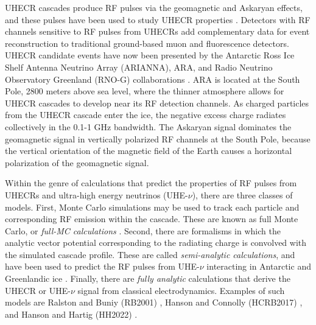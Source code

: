 \documentclass[amsmath,amssymb,aps,prd,10pt,twocolumn,showkeys]{revtex4}
\begin{document}
UHECR cascades produce RF pulses via the geomagnetic and Askaryan effects, and these pulses have been used to study UHECR properties \cite{huege2017radiowave-6f6,schroder2025radio-14a}.  Detectors with RF channels sensitive to RF pulses from UHECRs add complementary data for event reconstruction to traditional ground-based muon and fluorescence detectors.  UHECR candidate events have now been presented by the Antarctic Ross Ice Shelf Antenna Neutrino Array (ARIANNA), ARA, and Radio Neutrino Observatory Greenland (RNO-G) collaborations \cite{barwick2017radio-c4a,xwqy-yzrk,agarwal2025validating-d6c}.  ARA is located at the South Pole, 2800 meters above sea level, where the thinner atmosphere allows for UHECR cascades to develop near its RF detection channels.  As charged particles from the UHECR cascade enter the ice, the negative excess charge radiates collectively in the 0.1-1 GHz bandwidth.  The Askaryan signal dominates the geomagnetic signal in vertically polarized RF channels at the South Pole, because the vertical orientation of the magnetic field of the Earth causes a horizontal polarization of the geomagnetic signal.

Within the genre of calculations that predict the properties of RF pulses from UHECRs and ultra-high energy neutrinos (UHE-$\nu$), there are three classes of models.  First, Monte Carlo simulations may be used to track each particle and corresponding RF emission within the cascade.  These are known as full Monte Carlo, or \textit{full-MC calculations} \cite{zas1992electromagnetic-a30,10.1016/j.astropartphys.2009.06.005,alameddine2025simulating-06f}.  Second, there are formalisms in which the analytic vector potential corresponding to the radiating charge is convolved with the simulated cascade profile.  These are called \textit{semi-analytic calculations}, and have been used to predict the RF pulses from UHE-$\nu$ interacting in Antarctic and Greenlandic ice \cite{10.1103/physrevd.84.103003,PhysRevD.101.083005,10.1140/epjc/s10052-020-7612-8}.  Finally, there are \textit{fully analytic} calculations that derive the UHECR or UHE-$\nu$ signal from classical electrodynamics.  Examples of such models are Ralston and Buniy (RB2001) \cite{10.1103/physrevd.65.016003}, Hanson and Connolly (HCRB2017) \cite{10.1016/j.astropartphys.2017.03.008}, and Hanson and Hartig (HH2022) \cite{PhysRevD.105.123019}.
\end{document}
